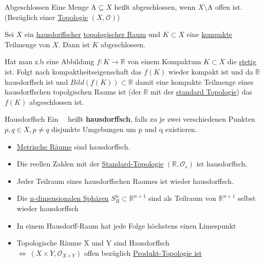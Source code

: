 \begin{titleDef}{Abgeschlossen}
\label{abgeschlossen}
Eine Menge $\mathrm{A}\subseteq X$ heißt abgeschlossen, wenn $X\setminus\mathrm{A}$ offen ist. (Bezüglich einer \hyperref[Topologie]{Topologie} $(X,\mathcal{O})$)\par
Sei $X$ ein \hyperref[hausdorffsch]{hausdorffscher} \hyperref[Topologie]{topologischer Raum} und $K\subset X$ eine \hyperref[kompakt]{kompakte} Teilmenge von $X$. Dann ist $K$ abgeschlossen.\par
Hat man z.b eine Abbildung $f:K\to\mathbb{R}$ von einem Kompaktum $K\subset X$ die \hyperref[stetig]{stetig} ist. Folgt nach kompaktheitseigenschaft das $f(K)$ wieder kompakt ist und da $\mathbb{R}$ hausdorffsch ist und $Bild(f(K))\subset\mathbb{R}$ damit eine kompakte Teilmenge eines hausdorffschen topolgischen Raums ist (der $\mathbb{R}$ mit der \hyperref[stdTopo]{standard Topologie}) das $f(K)$ abgeschlossen ist.
\end{titleDef}

\begin{titleDef}{Hausdorffsch}
\label{hausdorffsch}
Ein \Toporeflong~\Topo ~heißt \textbf{hausdorffsch}, falls zu je zwei verschiedenen Punkten $p,q\in X, p\neq q$ disjunkte Umgebungen um p und q existieren.
\begin{itemize}
    \item \hyperref[MetrischerRaum]{Metrische Räume} sind hausdorffsch.
    \item Die reellen Zahlen mit der \hyperref[stdTopo]{Standard-Topologie} $(\mathbb{R},\mathcal{O}_s)$ ist hausdorffsch.
    \item Jeder Teilraum eines hausdorffschen Raumes ist wieder hausdorffsch.
    \item Die \hyperref[ndimsphere]{n-dimensionalen Sphären} $S_R^n\subset\mathbb{R}^{n+1}$ sind als Teilraum von $\mathbb{R}^{n+1}$ selbst wieder hausdorffsch
    \item In einem Hausdorff-Raum hat jede Folge höchstens einen Limespunkt
    \item Topologische Räume X und Y sind Hausdorffsch\\ $\Leftrightarrow\ (X\times Y,\mathcal{O}_{X\times Y})$ offen bezüglich \hyperref[produktTopo]{Produkt-Topologie ist} 
\end{itemize}
\end{titleDef}

